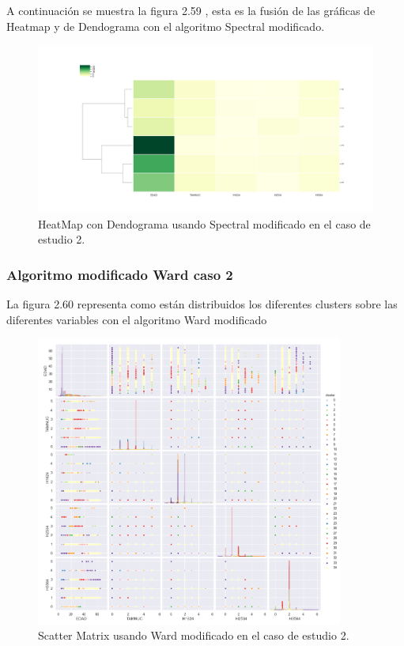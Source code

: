 	A continuación se muestra la figura 2.59 , esta es la fusión de las gráficas de 
	Heatmap y de Dendograma con el algoritmo Spectral modificado.  \\

	\begin{figure}[htb]
		\centering
		\includegraphics[width=1.0\textwidth]{./imagenes/caso2/heatmapcondendograma_caso2_Spectral_modificado}
		\caption{HeatMap con Dendograma usando Spectral modificado en el caso de estudio 2.} \label{fig:1}
	\end{figure}

	\subsubsection{Algoritmo modificado Ward caso 2}

	La figura 2.60 representa como están distribuidos los diferentes clusters sobre las diferentes variables con el 
	algoritmo Ward modificado\\

	\begin{figure}[htb]
		\centering
		\includegraphics[width=0.9\textwidth]{./imagenes/caso2/scatterMatrix_caso2_Ward_modificado}
		\caption{Scatter Matrix usando Ward modificado en el caso de estudio 2.} \label{fig:1}
	\end{figure}
	
